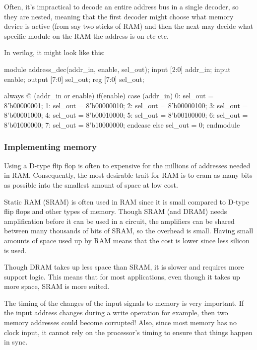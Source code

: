 Often, it's impractical to decode an entire address bus in a single decoder, so
they are nested, meaning that the first decoder might choose what memory device
is active (from say two sticks of RAM) and then the next may decide what
specific module on the RAM the address is on etc etc.

In verilog, it might look like this:

\begin{listing}{1}
	module address_dec(addr_in, enable, sel_out);
		input	[2:0]	addr_in;
		input			enable;
		output	[7:0]	sel_out;
		reg		[7:0]	sel_out;

		always @ (addr_in or enable)
			if(enable)
				case (addr_in)
				0: sel_out = 8'b00000001;
				1: sel_out = 8'b00000010;
				2: sel_out = 8'b00000100;
				3: sel_out = 8'b00001000;
				4: sel_out = 8'b00010000;
				5: sel_out = 8'b00100000;
				6: sel_out = 8'b01000000;
				7: sel_out = 8'b10000000;
				endcase
			else
				sel_out = 0;
	endmodule
\end{listing}

\subsubsection{Implementing memory}

Using a D-type flip flop is often to expensive for the millions of addresses
needed in RAM. Consequently, the most desirable trait for RAM is to cram as many
bits as possible into the smallest amount of space at low cost.

Static RAM (SRAM) is often used in RAM since it is small compared to D-type flip
flops and other types of memory. Though SRAM (and DRAM) needs amplification
before it can be used in a circuit, the amplifiers can be shared between many
thousands of bits of SRAM, so the overhead is small. Having small amounts of
space used up by RAM means that the cost is lower since less silicon is used.

Though DRAM takes up less space than SRAM, it is slower and requires more
support logic. This means that for most applications, even though it takes up
more space, SRAM is more suited.

The timing of the changes of the input signals to memory is very important. If
the input address changes during a write operation for example, then two memory
addresses could become corrupted! Also, since most memory has no clock input, it
cannot rely on the processor's timing to ensure that things happen in sync.

